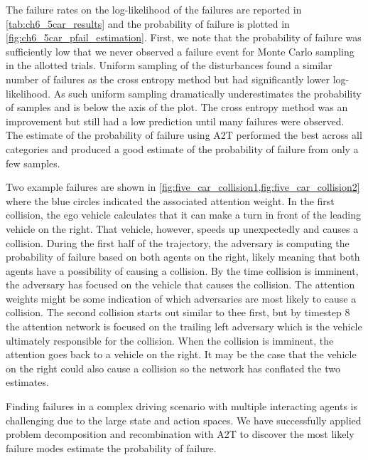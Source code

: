 The failure rates on the log-likelihood of the failures are reported in \cref{tab:ch6_5car_results} and the probability of failure is plotted in \cref{fig:ch6_5car_pfail_estimation}. First, we note that the probability of failure was sufficiently low that we never observed a failure event for Monte Carlo sampling in the allotted trials. Uniform sampling of the disturbances found a similar number of failures as the cross entropy method but had significantly lower log-likelihood. As such uniform sampling dramatically underestimates the probability of samples and is below the axis of the plot. The cross entropy method was an improvement but still had a low prediction until many failures were observed. The estimate of the probability of failure using A2T performed the best across all categories and produced a good estimate of the probability of failure from only a few samples.

Two example failures are shown in \cref{fig:five_car_collision1,fig:five_car_collision2} where the blue circles indicated the associated attention weight. In the first collision, the ego vehicle calculates that it can make a turn in front of the leading vehicle on the right. That vehicle, however, speeds up unexpectedly and causes a collision. During the first half of the trajectory, the adversary is computing the probability of failure based on both agents on the right, likely meaning that both agents have a possibility of causing a collision. By the time collision is imminent, the adversary has focused on the vehicle that causes the collision. The attention weights might be some indication of which adversaries are most likely to cause a collision. The second collision starts out similar to thee first, but by timestep \num{8} the attention network is focused on the trailing left adversary which is the vehicle ultimately responsible for the collision. When the collision is imminent, the attention goes back to a vehicle on the right. It may be the case that the vehicle on the right could also cause a collision so the network has conflated the two estimates. 

Finding failures in a complex driving scenario with multiple interacting agents is challenging due to the large state and action spaces. We have successfully applied problem decomposition and recombination with A2T to discover the most likely failure modes estimate the probability of failure. 

